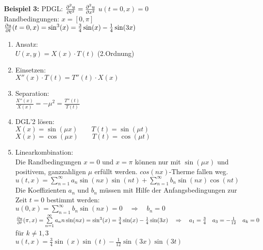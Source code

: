 \hfill
\begin{minipage}{0.49\textwidth}
\textbf{Beispiel 3: }PDGL: $\frac{\partial ^2u}{\partial t^2}=\frac{\partial ^2u}{\partial x^2}$ \quad $u(t=0,x)=0$\\
Randbedingungen: $x=[0,\pi]$ \\
\qquad\qquad $\frac{\partial u}{\partial t}(t=0,x)=\sin^3(x)=\frac34\sin(x)-\frac14\sin(3x)$
\begin{enumerate}
	\item Ansatz:\\[0.4cm]
	$U(x,y)=X(x) \cdot T(t)$ (2.Ordnung)
	\item Einsetzen:\\[0.4cm]
	$X''(x)\cdot T(t)=T''(t)\cdot X(x)$
	\item Separation:\\[0.4cm]
	$\frac{X''(x)}{X(x)}= -\mu^2=\frac{T''(t)}{T(t)}$
	\item DGL'2 lösen:\\[0.4cm]
		$X(x)=\sin(\mu x) \qquad T(t)=\sin(\mu t)$\\
		$X(x)=\cos(\mu x) \qquad T(t)=\cos(\mu t)$
	\item Linearkombination:\\[0.4cm]
		Die Randbedingungen $x=0$ und $x=\pi$ können nur mit $\sin(\mu x) $ und  positivem, ganzzahligen $\mu$ erfüllt werden. $cos(nx)$-Therme fallen weg.\\[0.4cm]
		$u(t,x)=\sum\limits_{n=1}^{\infty}{a_n\sin(nx)\sin(nt)} + \sum\limits_{n=1}^{\infty}{b_n\sin(nx)\cos(nt)}$\\[0.4cm]
		Die Koeffizienten $a_n$ und $b_n$ müssen mit Hilfe der Anfangsbedingungen zur Zeit $t=0$ bestimmt werden:\\[0.4cm]
		$u(0,x)=\sum\limits_{n=1}^{\infty}{b_n\sin(nx)}=0 \quad\Rightarrow\quad b_n=0$\\[0.2cm]
		$\frac{\partial u}{\partial t}(\pi,x)=\sum\limits_{n=1}^{\infty}{a_nn\sin(nx)}=\sin^3(x)=\frac34\sin(x)-\frac14\sin(3x) \quad\Rightarrow\quad a_1=\frac34 \quad a_3=-\frac{1}{12}\quad a_k=0$ für $k\neq 1,3$\\[0.4cm]
		$u(t,x)=\frac34\sin(x)\sin(t)-\frac1{12}\sin(3x)\sin(3t)$
\end{enumerate}
\end{minipage}




